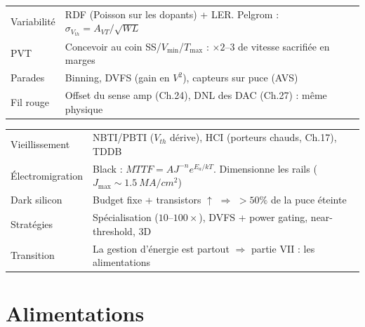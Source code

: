 \documentclass[12pt,a4paper,twoside]{book}
\begin{document}
\begin{approfondissement}[title={\color{white} Résumé --- Approfondissement}]
\begin{center}
\renewcommand{\arraystretch}{1.3}
\begin{tabular}{p{3.5cm}p{9.5cm}}
\toprule
Variabilité & RDF (Poisson sur les dopants) + LER. Pelgrom : $\sigma_{V_{th}} = A_{VT}/\sqrt{WL}$ \\
PVT & Concevoir au coin SS/$V_{\min}$/$T_{\max}$ : $\times 2$--$3$ de vitesse sacrifiée en marges \\
Parades & Binning, DVFS (gain en $V^2$), capteurs sur puce (AVS) \\
Fil rouge & Offset du sense amp (Ch.24), DNL des DAC (Ch.27) : même physique \\
\bottomrule
\end{tabular}
\end{center}
\end{approfondissement}

\begin{ingenieur}[title={\color{white} Résumé --- Niveau Ingénieur}]
\begin{center}
\renewcommand{\arraystretch}{1.3}
\begin{tabular}{p{3.5cm}p{9.5cm}}
\toprule
Vieillissement & NBTI/PBTI ($V_{th}$ dérive), HCI (porteurs chauds, Ch.17), TDDB \\
Électromigration & Black : $MTTF = AJ^{-n}e^{E_a/kT}$. Dimensionne les rails ($J_{\max}\sim\SI{1.5}{MA/cm^2}$) \\
Dark silicon & Budget fixe + transistors $\uparrow$ $\Rightarrow$ $>50\%$ de la puce éteinte \\
Stratégies & Spécialisation ($10$--$100\times$), DVFS + power gating, near-threshold, 3D \\
Transition & La gestion d'énergie est partout $\Rightarrow$ partie VII : les alimentations \\
\bottomrule
\end{tabular}
\end{center}
\end{ingenieur}


\part{Alimentations}

\end{document}

